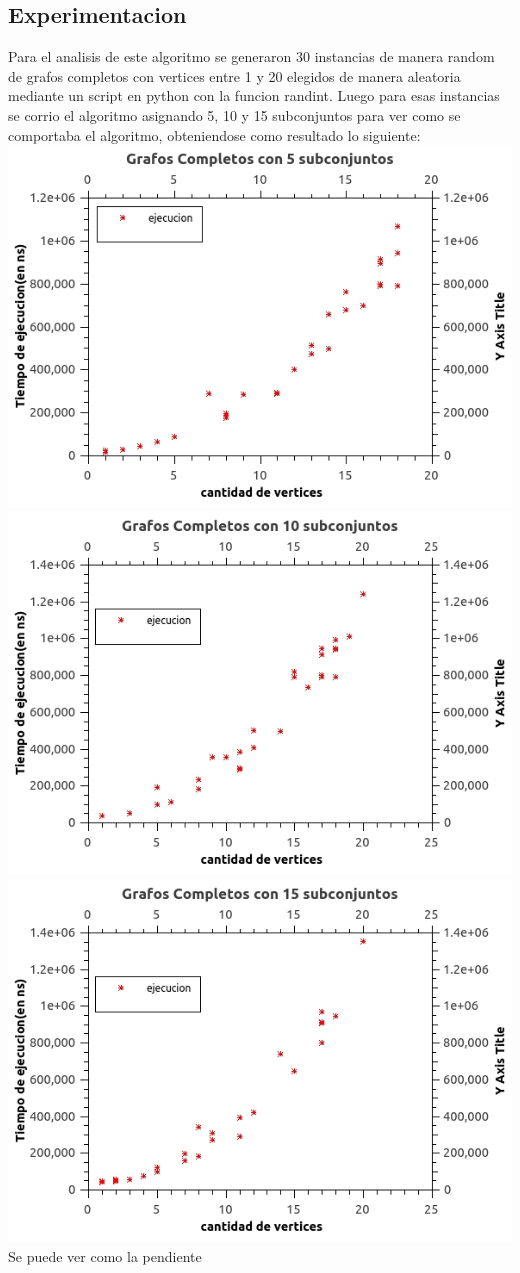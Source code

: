 \subsection{Experimentacion}
Para el analisis de este algoritmo se generaron 30 instancias de manera random de grafos completos con vertices entre 1 y 20 elegidos de manera aleatoria mediante un script en python con la funcion randint.
Luego para esas instancias se corrio el algoritmo asignando 5, 10 y 15 subconjuntos para ver como se comportaba el algoritmo, obteniendose como resultado lo siguiente:\\
\includegraphics[scale=0.5]{Ej2/k5.jpg}
\includegraphics[scale=0.5]{Ej2/k10.jpg}\\
\includegraphics[scale=0.5]{Ej2/k15.jpg}\\

Se puede ver como la pendiente
